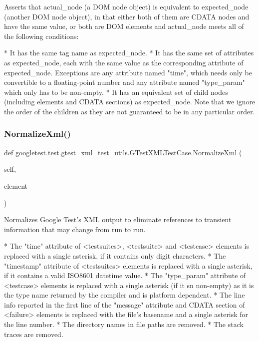 \begin{DoxyVerb}Asserts that actual_node (a DOM node object) is equivalent to
expected_node (another DOM node object), in that either both of
them are CDATA nodes and have the same value, or both are DOM
elements and actual_node meets all of the following conditions:

*  It has the same tag name as expected_node.
*  It has the same set of attributes as expected_node, each with
   the same value as the corresponding attribute of expected_node.
   Exceptions are any attribute named "time", which needs only be
   convertible to a floating-point number and any attribute named
   "type_param" which only has to be non-empty.
*  It has an equivalent set of child nodes (including elements and
   CDATA sections) as expected_node.  Note that we ignore the
   order of the children as they are not guaranteed to be in any
   particular order.
\end{DoxyVerb}
 \mbox{\label{classgoogletest_1_1test_1_1gtest__xml__test__utils_1_1_g_test_x_m_l_test_case_acaccf5c860f8404da1bb4031d022103d}} 
\subsubsection{\texorpdfstring{NormalizeXml()}{NormalizeXml()}}
{\footnotesize\ttfamily def googletest.\+test.\+gtest\+\_\+xml\+\_\+test\+\_\+utils.\+G\+Test\+X\+M\+L\+Test\+Case.\+Normalize\+Xml (\begin{DoxyParamCaption}\item[{}]{self,  }\item[{}]{element }\end{DoxyParamCaption})}

\begin{DoxyVerb}Normalizes Google Test's XML output to eliminate references to transient
information that may change from run to run.

*  The "time" attribute of <testsuites>, <testsuite> and <testcase>
   elements is replaced with a single asterisk, if it contains
   only digit characters.
*  The "timestamp" attribute of <testsuites> elements is replaced with a
   single asterisk, if it contains a valid ISO8601 datetime value.
*  The "type_param" attribute of <testcase> elements is replaced with a
   single asterisk (if it sn non-empty) as it is the type name returned
   by the compiler and is platform dependent.
*  The line info reported in the first line of the "message"
   attribute and CDATA section of <failure> elements is replaced with the
   file's basename and a single asterisk for the line number.
*  The directory names in file paths are removed.
*  The stack traces are removed.
\end{DoxyVerb}
 

